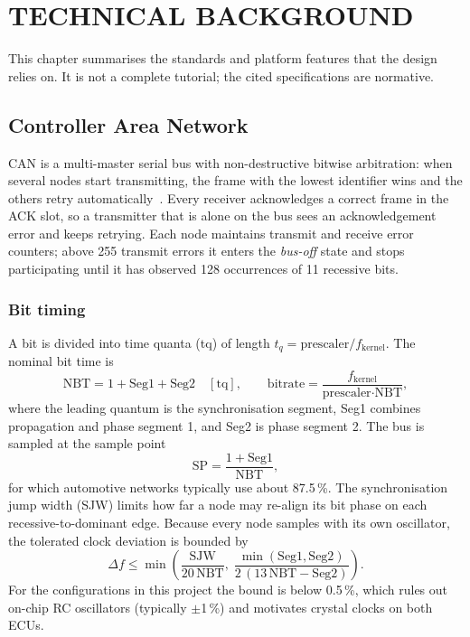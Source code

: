 \chapter{TECHNICAL BACKGROUND}
\label{ch:background}

This chapter summarises the standards and platform features that the design relies on. It is not a complete tutorial; the cited specifications are normative.

\section{Controller Area Network}

CAN is a multi-master serial bus with non-destructive bitwise arbitration: when several nodes start transmitting, the frame with the lowest identifier wins and the others retry automatically~\cite{BoschCAN20,ISO11898-1}. Every receiver acknowledges a correct frame in the ACK slot, so a transmitter that is alone on the bus sees an acknowledgement error and keeps retrying. Each node maintains transmit and receive error counters; above 255 transmit errors it enters the \textit{bus-off} state and stops participating until it has observed 128 occurrences of 11 recessive bits.

\subsection{Bit timing}

A bit is divided into time quanta (tq) of length $t_q = \text{prescaler} / f_\text{kernel}$. The nominal bit time is
\begin{equation}
  \text{NBT} = 1 + \text{Seg1} + \text{Seg2} \quad [\text{tq}], \qquad
  \text{bitrate} = \frac{f_\text{kernel}}{\text{prescaler}\cdot\text{NBT}},
\end{equation}
where the leading quantum is the synchronisation segment, Seg1 combines propagation and phase segment 1, and Seg2 is phase segment 2. The bus is sampled at the sample point
\begin{equation}
  \text{SP} = \frac{1 + \text{Seg1}}{\text{NBT}},
\end{equation}
for which automotive networks typically use about 87.5\,\%. The synchronisation jump width (SJW) limits how far a node may re-align its bit phase on each recessive-to-dominant edge. Because every node samples with its own oscillator, the tolerated clock deviation is bounded by~\cite{ISO11898-1}
\begin{equation}
  \Delta f \le \min\left( \frac{\text{SJW}}{20\,\text{NBT}},\;
  \frac{\min(\text{Seg1},\text{Seg2})}{2\,(13\,\text{NBT} - \text{Seg2})} \right).
  \label{eq:tolerance}
\end{equation}
For the configurations in this project the bound is below 0.5\,\%, which rules out on-chip RC oscillators (typically $\pm$1\,\%) and motivates crystal clocks on both ECUs.

